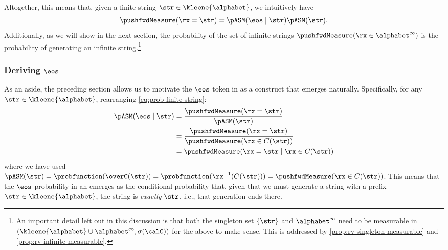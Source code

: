 Altogether, this means that, given a finite string $\str\in\kleene{\alphabet}$, we intuitively have
\begin{equation}
\pushfwdMeasure(\rx=\str) =\pASM(\eos \mid \str)\pASM(\str).\label{eq:prob-finite-string}
\end{equation}
Additionally, as we will show in the next section, the probability of the set of infinite strings $\pushfwdMeasure(\rx \in \alphabet^{\infty})$ is the probability of generating an infinite string.\footnote{An important detail left out in this discussion is that both the singleton set $\{\str\}$ and $\alphabet^\infty$ need to be measurable in $(\kleene{\alphabet}\cup\alphabet^\infty, \sigma(\calC))$ for the above to make sense.
This is addressed by \cref{prop:rv-singleton-measurable} and \cref{prop:rv-infinite-measurable}.}

\subsubsection{Deriving $\eos$}
As an aside, the preceding section allows us to motivate the $\eos$ token in \autoregmodel as a construct that emerges naturally.
Specifically, for any $\str \in \kleene{\alphabet}$, rearranging \cref{eq:prob-finite-string}:
\begin{subequations}
\begin{align}
\pASM(\eos \mid \str) &= \frac{\pushfwdMeasure(\rx = \str)}{\pASM(\str)}  \\
    &= \frac{\pushfwdMeasure(\rx = \str)}{\pushfwdMeasure(\rx \in C({\str}))} \\
    &= \pushfwdMeasure(\rx = \str \mid \rx \in C({\str}))
\end{align}
\end{subequations}
where we have used $\pASM(\str) = \probfunction(\overC(\str)) = \probfunction(\rx^{-1}(C(\str))) = \pushfwdMeasure(\rx\in C(\str))$.
This means that the $\eos$ probability in an \autoregmodel emerges as the conditional probability that, given that we must generate a string with a prefix $\str \in \kleene{\alphabet}$, the string is \emph{exactly} $\str$, i.e., that generation ends there.


